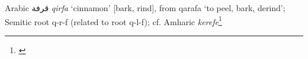 \begin{etymology}\label{ety:qirfa}
Arabic {قرفة} \textit{qirfa} `cinnamon' [bark, rind], from qarafa `to peel, bark, derind'; Semitic root q-r-f (related to root q-l-f); cf. Amharic \textit{kerefe}\footnote{\textcites[888]{wehr_dictionary_1976}[427]{leslau_comparative_1991}}
\end{etymology}